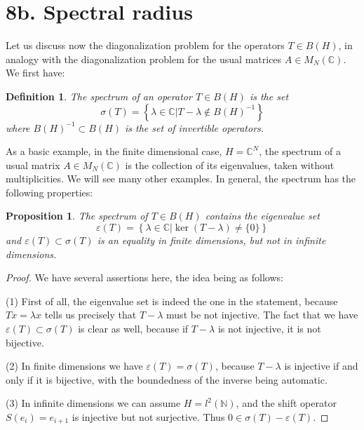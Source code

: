 \documentclass[12pt]{amsbook}
\newtheorem{definition}[theorem]{Definition}
\newtheorem{proposition}[theorem]{Proposition}
\begin{document}
\section*{8b. Spectral radius}

Let us discuss now the diagonalization problem for the operators $T\in B(H)$, in analogy with the diagonalization problem for the usual matrices $A\in M_N(\mathbb C)$. We first have:

\begin{definition}
The spectrum of an operator $T\in B(H)$ is the set
$$\sigma(T)=\left\{\lambda\in\mathbb C\Big|T-\lambda\not\in B(H)^{-1}\right\}$$
where $B(H)^{-1}\subset B(H)$ is the set of invertible operators.
\end{definition}

As a basic example, in the finite dimensional case, $H=\mathbb C^N$, the spectrum of a usual matrix $A\in M_N(\mathbb C)$ is the collection of its eigenvalues, taken without multiplicities. We will see many other examples. In general, the spectrum has the following properties:


\begin{proposition}
The spectrum of $T\in B(H)$ contains the eigenvalue set
$$\varepsilon(T)=\left\{\lambda\in\mathbb C\Big|\ker(T-\lambda)\neq\{0\}\right\}$$
and $\varepsilon(T)\subset\sigma(T)$ is an equality in finite dimensions, but not in infinite dimensions.
\end{proposition}

\begin{proof}
We have several assertions here, the idea being as follows:

\medskip

(1) First of all, the eigenvalue set is indeed the one in the statement, because $Tx=\lambda x$ tells us precisely that $T-\lambda$ must be not injective. The fact that we have $\varepsilon(T)\subset\sigma(T)$ is clear as well, because if $T-\lambda$ is not injective, it is not bijective.

\medskip

(2) In finite dimensions we have $\varepsilon(T)=\sigma(T)$, because $T-\lambda$ is injective if and only if it is bijective, with the boundedness of the inverse being automatic. 

\medskip

(3) In infinite dimensions we can assume $H=l^2(\mathbb N)$, and the shift operator $S(e_i)=e_{i+1}$ is injective but not surjective. Thus $0\in\sigma(T)-\varepsilon(T)$.
\end{proof}
\end{document}

